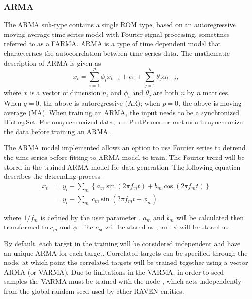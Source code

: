 \subsubsection{ARMA}
\label{subsubsec:arma}
The ARMA sub-type contains a single ROM type, based on an autoregressive moving average time series model with
Fourier signal processing, sometimes referred to as a FARMA.
%
ARMA is a type of time dependent model that characterizes the autocorrelation between time series data. The mathematic description of ARMA is given as
\begin{equation*}
x_t = \sum_{i=1}^p\phi_ix_{t-i}+\alpha_t+\sum_{j=1}^q\theta_j\alpha_{t-j},
\end{equation*}
where $x$ is a vector of dimension $n$, and $\phi_i$ and $\theta_j$ are both $n$ by $n$ matrices. When $q=0$, the above is
autoregressive (AR); when $p=0$, the above is moving average (MA).
When
training an ARMA, the input needs to be a synchronized HistorySet. For unsynchronized data, use PostProcessor methods to
synchronize the data before training an ARMA.

The ARMA model implemented allows an option to use Fourier series to detrend the time series before fitting to ARMA model to
train. The Fourier trend will be stored in the trained ARMA model for data generation. The following equation
describes the detrending
process.
\begin{equation*}
\begin{aligned}
x_t &= y_t - \sum_m\left\{a_m\sin(2\pi f_mt)+b_m\cos(2\pi f_mt)\right\}  \\
&=y_t - \sum_m\ c_m\sin(2\pi f_mt+\phi_m)
\end{aligned}
\end{equation*}

where $1/f_m$ is defined by the user parameter . \nb $a_m$ and $b_m$ will be calculated then transformed to
$c_m$ and $\phi$. The $c_m$ will be stored as , and $\phi$ will be stored as .

By default, each target in the training will be considered independent and have an unique ARMA for each
target.  Correlated targets can be specified through the  node, at which point
the correlated targets will be trained together using a vector ARMA (or VARMA). Due to limitations in
the VARMA, in order to seed samples the VARMA must be trained with the node , which acts
independently from the global random seed used by other RAVEN entities.

